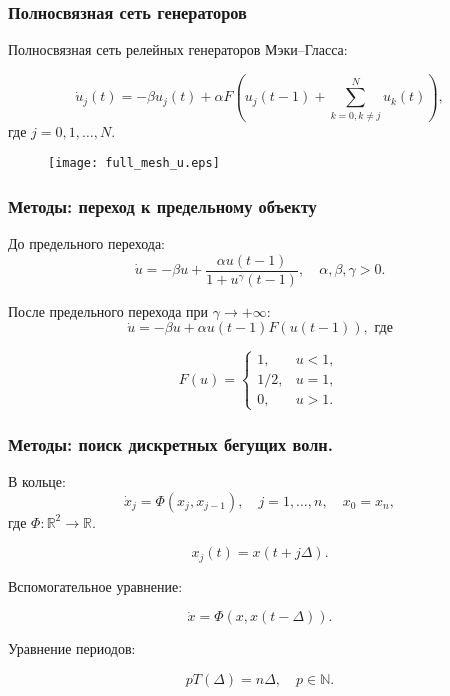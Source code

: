 \begin{frame}
	\frametitle{Полносвязная сеть генераторов}
	
	Полносвязная сеть релейных генераторов Мэки--Гласса:
	
	\begin{equation}
		\dot{u}_j(t) = -\beta u_j(t) + \alpha F \left(u_j(t - 1) + \sum\limits_{k = 0, k\neq j}^N u_k(t)\right),
	\end{equation}
	где $j = 0, 1, \dots, N.$
	
	\begin{figure}
		\centering
		\texttt{[image: full\_mesh\_u.eps]}
	\end{figure}
	
\end{frame}

\begin{frame}
	\frametitle{Методы: переход к предельному объекту}
	
	До предельного перехода:
	\begin{equation*}
		\dot{u}=-\beta u + \frac{\alpha u(t - 1)}{1 + u^{\gamma}(t - 1)}, 
		\quad \alpha, \beta, \gamma > 0.
	\end{equation*}
	
	\pause
	
	После предельного перехода при $\gamma \to +\infty$:
	\begin{equation*}
		\dot{u}=-\beta u + \alpha u(t - 1) F(u(t - 1)), \text{ где}
	\end{equation*}
	
	\[
	F(u) = \begin{cases}
				1, & u < 1,\\
				1/2, & u = 1,\\
				0, & u > 1.
			\end{cases}
	\]
	
\end{frame}

\begin{frame}
	\frametitle{Методы: поиск дискретных бегущих волн.}
	
	В кольце:
	\begin{equation*}
		\dot{x}_j=\Phi(x_j, x_{j-1}), \quad j=1, \ldots, n, \quad x_{0} = x_{n},
	\end{equation*}
	где $\Phi:\mathbb{R}^2\to\mathbb{R}$. 
	
	\begin{equation*}
		x_j(t) = x(t + j\Delta).
	\end{equation*}
	
	\pause
	
	Вспомогательное уравнение:
	
	\begin{equation}
		\label{eq:intro:Phi_circ}
		\dot{x}=\Phi(x, x(t-\Delta)).
	\end{equation}
	
	Уравнение периодов:
	
	\begin{equation}
	\label{eq_period_Delta}
	p T(\Delta) = n\Delta, \quad p \in \mathbb{N}.
	\end{equation}
\end{frame}

